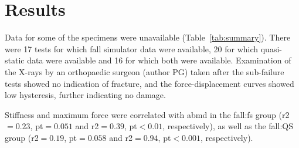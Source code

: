 \section{Results}
Data for some of the specimens were unavailable (Table~\ref{tab:summary}).
There were 17 tests for which fall simulator data were available, 20 for which quasi-static data were available and 16 for which both were available.
Examination of the X-rays by an orthopaedic surgeon (author PG) taken after the sub-failure tests showed no indication of fracture, and the force-displacement curves showed low hysteresis, further indicating no damage.

Stiffness and maximum force were correlated with \ac{abmd} in the fall:\ac{fs} group (\ac{r2}$ = 0.23$, \ac{pt}$ = 0.051$ and \ac{r2}$= 0.39$, \ac{pt}$ < 0.01$, respectively), as well as the fall:\ac{QS} group (\ac{r2}$ = 0.19$, \ac{pt}$ = 0.058$ and \ac{r2}$ = 0.94$, \ac{pt}$ < 0.001$, respectively).

